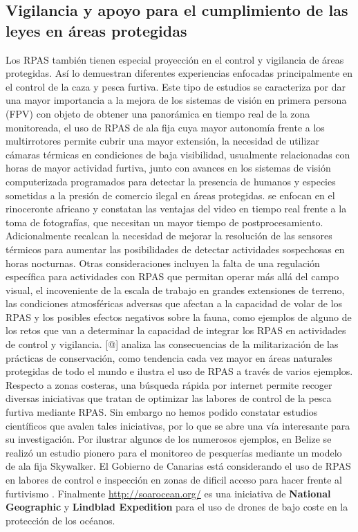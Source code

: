 \documentclass[9t,twocolumn]{article}
\begin{document}
\subsection{Vigilancia y apoyo para el cumplimiento de las leyes en
áreas
protegidas}\label{vigilancia-y-apoyo-para-el-cumplimiento-de-las-leyes-en-areas-protegidas}

Los RPAS también tienen especial proyección en el control y vigilancia
de áreas protegidas. Así lo demuestran diferentes experiencias enfocadas
principalmente en el control de la caza y pesca furtiva. Este tipo de
estudios se caracteriza por dar una mayor importancia a la mejora de los
sistemas de visión en primera persona (FPV) con objeto de obtener una
panorámica en tiempo real de la zona monitoreada, el uso de RPAS de ala
fija cuya mayor autonomía frente a los multirrotores permite cubrir una
mayor extensión, la necesidad de utilizar cámaras térmicas en
condiciones de baja visibilidad, usualmente relacionadas con horas de
mayor actividad furtiva, junto con avances en los sistemas de visión
computerizada programados para detectar la presencia de humanos y
especies sometidas a la presión de comercio ilegal en áreas protegidas.
\citep{Mulero-Pazmany2014} se enfocan en el rinoceronte africano y
constatan las ventajas del video en tiempo real frente a la toma de
fotografías, que necesitan un mayor tiempo de postprocesamiento.
Adicionalmente recalcan la necesidad de mejorar la resolución de las
sensores térmicos para aumentar las posibilidades de detectar
actividades sospechosas en horas nocturnas. Otras consideraciones
incluyen la falta de una regulación específica para actividades con RPAS
que permitan operar más allá del campo visual, el incoveniente de la
escala de trabajo en grandes extensiones de terreno, las condiciones
atmosféricas adversas que afectan a la capacidad de volar de los RPAS y
los posibles efectos negativos sobre la fauna, como ejemplos de alguno
de los retos que van a determinar la capacidad de integrar los RPAS en
actividades de control y vigilancia. {[}@{]} analiza las consecuencias
de la militarización de las prácticas de conservación, como tendencia
cada vez mayor en áreas naturales protegidas de todo el mundo e ilustra
el uso de RPAS a través de varios ejemplos. Respecto a zonas costeras,
una búsqueda rápida por internet permite recoger diversas iniciativas
que tratan de optimizar las labores de control de la pesca furtiva
mediante RPAS. Sin embargo no hemos podido constatar estudios
científicos que avalen tales iniciativas, por lo que se abre una vía
interesante para su investigación. Por ilustrar algunos de los numerosos
ejemplos, en Belize se realizó un estudio pionero para el monitoreo de
pesquerías mediante un modelo de ala fija Skywalker. El Gobierno de
Canarias está considerando el uso de RPAS en labores de control e
inspección en zonas de dificil acceso para hacer frente al furtivismo
\citep{Canarias2017} . Finalmente \url{http://soarocean.org/} es una
iniciativa de \textbf{National Geographic} y \textbf{Lindblad
Expedition} para el uso de drones de bajo coste en la protección de los
océanos.
\end{document}
